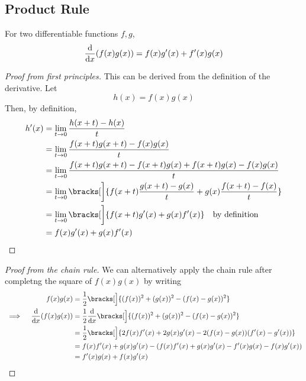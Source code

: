 \subsection{Product Rule} \label{sec_calc_product}

\begin{theorem}
    For two differentiable functions \(f, g\),
    \begin{equation*}
        \dv{x} (f(x)g(x)) = f(x)g'(x) + f'(x)g(x)
    \end{equation*}
\end{theorem}
\begin{proof}[Proof from first principles]
    This can be derived from the definition of the derivative. Let
    \begin{equation*}
        h(x) = f(x)g(x)
    \end{equation*}
    Then, by definition,
    \begin{align*}
        h'(x) &= \lim_{t \to 0} \frac{h(x + t) - h(x)} t \\
              &= \lim_{t \to 0} \frac{f(x + t)g(x + t) - f(x)g(x)} t \\
              &= \lim_{t \to 0} \frac{f(x + t)g(x + t) - f(x + t)g(x)
                                    + f(x + t)g(x) - f(x)g(x)} t \\
              &= \lim_{t \to 0} \bracks[\bigg]{
                  f(x + t) \frac{g(x + t) - g(x)} t
                + g(x) \frac{f(x + t) - f(x)} t} \\
              &= \lim_{t \to 0} \bracks[\bigg]{
                  f(x + t)g'(x)
                + g(x) f'(x)} \quad \text{by definition} \\
              &= f(x)g'(x) + g(x)f'(x)
        \qedhere
    \end{align*}
\end{proof}
\begin{proof}[Proof from the chain rule]
    We can alternatively apply the chain rule after completng the square of
    \(f(x)g(x)\) by writing
    \begin{alignat*}{2}
        && f(x)g(x) &= \frac 12 \bracks[\Big]
                        {(f(x))^2 + (g(x))^2 - (f(x) - g(x))^2} \\
        &\implies{}& \dv{x} (f(x)g(x))
                    &= \frac 12 \dv{x} \bracks[\Big]
                        {(f(x))^2 + (g(x))^2 - (f(x) - g(x))^2} \\
        &&          &= \frac 12 \bracks[\Big]
                        {2f(x)f'(x) + 2g(x)g'(x)
                       - 2(f(x) - g(x))(f'(x) - g'(x))} \\
        &&          &= f(x)f'(x) + g(x)g'(x)
                     - (f(x)f'(x) + g(x)g'(x) - f'(x)g(x) - f(x)g'(x)) \\
        &&          &= f'(x)g(x) + f(x)g'(x) \qedhere
    \end{alignat*}
\end{proof}
